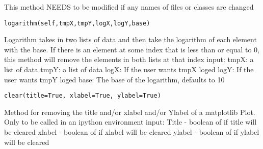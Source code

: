 		This method NEEDS to be modified if any names of files or classes
		are changed
\newline
\newline
\begin{verbatim}
logarithm(self,tmpX,tmpY,logX,logY,base)
\end{verbatim}
Logarithm takes in two lists of data and then take the 
		logarithm of each element with the base. If there is an
		element at some index that is less than or equal to 0, this 
		method will remove the elements in both lists at that index\newline
		input:\newline
		tmpX: a list of data\newline
		tmpY: a list of data\newline
		logX: If the user wants tmpX loged\newline
		logY: If the user wants tmpY loged\newline
		base: The base of the logarithm, defaults to 10\newline
		
		
\begin{verbatim}
clear(title=True, xlabel=True, ylabel=True)
\end{verbatim}
Method for removing the title and/or xlabel and/or Ylabel
		of a matplotlib Plot.  Only to be called in an ipython 
		environment\newline
		input:\newline
		Title -  boolean of if title will be cleared \newline
		xlabel - boolean of if xlabel will be cleared \newline
		ylabel - boolean of if ylabel will be cleared \newline\newline

